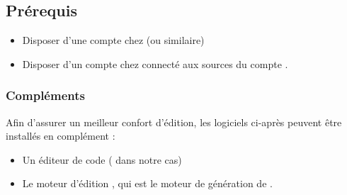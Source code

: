 \documentclass[letterpaper,10pt,french]{sphinxmanual}
\begin{document}
\subsection{Prérequis}
\label{\detokenize{readthedocs/maintenance:prerequis}}\begin{itemize}
\item {} 
Disposer d’une compte chez {\hyperref[\detokenize{readthedocs/glossary:term-github}]{}} (ou similaire)

\item {} 
Disposer d’un compte chez {\hyperref[\detokenize{readthedocs/glossary:term-read-the-docs}]{}} connecté aux sources du compte {\hyperref[\detokenize{readthedocs/glossary:term-github}]{}}.

\end{itemize}


\subsubsection{Compléments}
\label{\detokenize{readthedocs/maintenance:complements}}
Afin d’assurer un meilleur confort d’édition, les logiciels ci-après peuvent être installés en complément :
\begin{itemize}
\item {} 
Un éditeur de code ({\hyperref[\detokenize{readthedocs/glossary:term-visual-studio-code}]{}} dans notre cas)

\item {} 
Le moteur d’édition {\hyperref[\detokenize{readthedocs/glossary:term-sphinx}]{}}, qui est le moteur de génération de {\hyperref[\detokenize{readthedocs/glossary:term-read-the-docs}]{}}.

\end{itemize}
\end{document}

